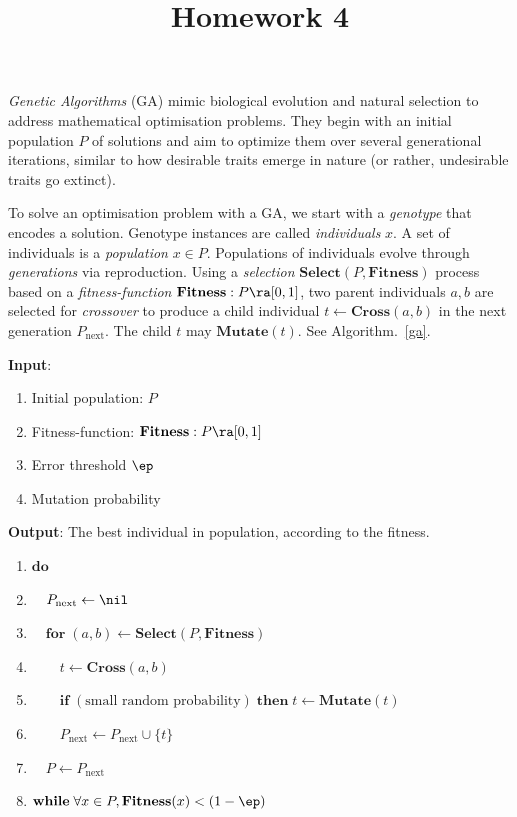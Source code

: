 \documentclass{homework}
\title{Homework 4}
\DeclareRobustCommand{\DO}{\mathbf{do\;}}
\DeclareRobustCommand{\IF}{\mathbf{if\;}}
\DeclareRobustCommand{\THEN}{\mathbf{then\;}}
\DeclareRobustCommand{\WHILE}{\mathbf{while\;}}
\DeclareRobustCommand{\FOR}{\mathbf{for\;}}
\DeclareRobustCommand{\SL}{\mathbf{Select}}
\DeclareRobustCommand{\FIT}{\mathbf{Fitness}}
\DeclareRobustCommand{\CROSS}{\mathbf{Cross}}
\DeclareRobustCommand{\MUTATE}{\mathbf{Mutate}}
\begin{document}
 \maketitle

\textit{Genetic Algorithms} (GA) mimic biological evolution and
natural selection to address mathematical optimisation problems. They
begin with an initial population $P$ of solutions and aim to optimize
them over several generational iterations, similar to how desirable
traits emerge in nature (or rather, undesirable traits go extinct).

To solve an optimisation problem with a GA, we start with a
\emph{genotype} that encodes a solution. Genotype instances are
called \emph{individuals} $x$. A set of individuals is a
\emph{population} $x \in P$. Populations of individuals evolve
through \emph{generations} via reproduction. Using a
\emph{selection} $\SL(P, \FIT)$ process based on a
\emph{fitness-function} $\FIT: P \ra [0, 1]$, two parent
individuals $a, b$ are selected for \emph{crossover} to produce a
child individual $t \leftarrow \CROSS(a, b)$ in the next
generation $P_\text{next}$. The child $t$ may $\MUTATE(t)$. See
Algorithm.~\ref{ga}.

\begin{algorithm}
  \begin{flushleft}
    \noindent\textbf{Input}:
    \begin{enumerate}
      \item Initial population: $P$
      \item Fitness-function: $\FIT: P \ra [0, 1]$
      \item Error threshold $\ep$
      \item Mutation probability
    \end{enumerate}
    \noindent\textbf{Output}:
    The best individual in population, according to the fitness.
  \end{flushleft}%
  \begin{enumerate}[label=\arabic*:,noitemsep,partopsep=0pt,topsep=0pt,parsep=0pt]%
    \item $\DO$
    \item $\quad P_\text{next} \leftarrow \nil$
    \item $\quad \FOR (a, b) \leftarrow \SL(P, \FIT)$
    \item $\quad\quad t \leftarrow \CROSS(a, b)$
    \item $\quad\quad \IF (\text{small random probability})\;\THEN t \leftarrow \MUTATE(t)$
    \item $\quad\quad P_\text{next} \leftarrow P_\text{next} \cup \{t\}$
    \item $\quad P \leftarrow P_\text{next}$
    \item $\WHILE \forall x \in P, \FIT(x) < (1 - \ep)$
  \end{enumerate}%
  \caption{%
    Pseudo code for a simple Genetic Algorithm. See Mitchell, pg. 251
    or Russell and Norvig, pg 129 for more details.
  }%
  \label{ga}%
\end{algorithm}%
\end{document}
